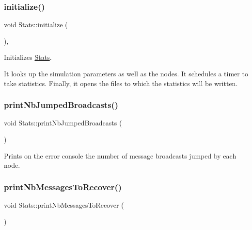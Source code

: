 \subsubsection{\texorpdfstring{initialize()}{initialize()}}
{\footnotesize\ttfamily void Stats\+::initialize (\begin{DoxyParamCaption}{ }\end{DoxyParamCaption})\hspace{0.3cm}{\ttfamily [private]}, {\ttfamily [virtual]}}



Initializes \hyperlink{class_stats}{Stats}. 

It looks up the simulation parameters as well as the nodes. It schedules a timer to take statistics. Finally, it opens the files to which the statistics will be written. \mbox{\label{class_stats_aaba10264a569b9240a300ddc341e6a8c}} 
\subsubsection{\texorpdfstring{print\+Nb\+Jumped\+Broadcasts()}{printNbJumpedBroadcasts()}}
{\footnotesize\ttfamily void Stats\+::print\+Nb\+Jumped\+Broadcasts (\begin{DoxyParamCaption}{ }\end{DoxyParamCaption})\hspace{0.3cm}{\ttfamily [private]}}



Prints on the error console the number of message broadcasts jumped by each node. 

\mbox{\label{class_stats_ae2c59851f26885a62c2e65fda16d47ee}} 
\subsubsection{\texorpdfstring{print\+Nb\+Messages\+To\+Recover()}{printNbMessagesToRecover()}}
{\footnotesize\ttfamily void Stats\+::print\+Nb\+Messages\+To\+Recover (\begin{DoxyParamCaption}{ }\end{DoxyParamCaption})\hspace{0.3cm}{\ttfamily [private]}}



